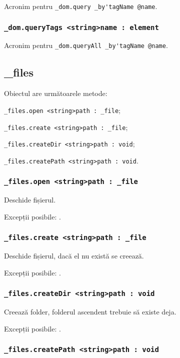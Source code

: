 Acronim pentru \lstinline|_dom.query _by'tagName @name|.

\subsubsection{\lstinline|_dom.queryTags <string>name : element|}

Acronim pentru \lstinline|_dom.queryAll _by'tagName @name|.

\subsection{{\color{orange} \_files}}

Obiectul \files{} are următoarele metode:
\begin{icItems}
	\item \lstinline|_files.open <string>path : _file|;
	\item \lstinline|_files.create <string>path : _file|;
	\item \lstinline|_files.createDir <string>path : void|;
	\item \lstinline|_files.createPath <string>path : void|.
\end{icItems}

\subsubsection{\lstinline|_files.open <string>path : _file|}

Deschide fișierul.

Excepții posibile: .

\subsubsection{\lstinline|_files.create <string>path : _file|}

Deschide fișierul, dacă el nu există se creează.

Excepții posibile: .

\subsubsection{\lstinline|_files.createDir <string>path : void|}

Creează folder, folderul ascendent trebuie să existe deja.

Excepții posibile: .

\subsubsection{\lstinline|_files.createPath <string>path : void|}

